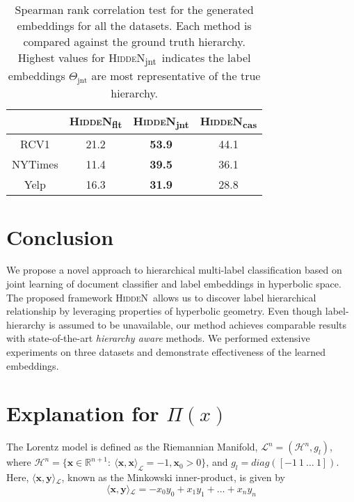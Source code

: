 \documentclass[11pt,a4paper]{article}
\newcommand{\model}{\mbox{\textsc{HiddeN}}}
\newcommand{\modeljnt}{\mbox{\textsc{HiddeN}\textsubscript{jnt}}}
\newcommand{\modelcas}{\mbox{\textsc{HiddeN}\textsubscript{cas}}}
\newcommand{\modelflt}{\mbox{\textsc{HiddeN}\textsubscript{flt}}}
\begin{document}
\begin{table}[!h]
\centering
\caption{Spearman rank correlation test for the generated embeddings for all the datasets. Each method is compared against the ground truth hierarchy. Highest values for \modeljnt\ indicates the label embeddings $\Theta_{\text{jnt}}$ are most representative of the true hierarchy.}
\label{tab:correlation}
\begin{adjustbox}{max width=0.48\textwidth}
\begin{tabular}{cccc} 
\toprule
& \modelflt & \modeljnt & \modelcas \\
\toprule
RCV1 & 21.2 & \textbf{53.9} & 44.1 \\
NYTimes & 11.4 & \textbf{39.5}   & 36.1 \\
Yelp & 16.3 & \textbf{31.9}   & 28.8 \\
\bottomrule
\end{tabular}
\end{adjustbox}
\end{table}

\section{Conclusion}
We propose a novel approach to hierarchical multi-label classification based on joint learning of document classifier and label embeddings in hyperbolic space. The proposed framework \model\ allows us to discover label hierarchical relationship by leveraging properties of hyperbolic geometry. Even though label-hierarchy is assumed to be unavailable, our method achieves comparable results with state-of-the-art \textit{hierarchy aware} methods. We performed extensive experiments on three datasets and demonstrate effectiveness of the learned embeddings.




\newpage
\appendix

\section{Explanation for $\Pi(x)$}
The Lorentz model is defined as the Riemannian Manifold, $\mathcal{L}^{n} = (\mathcal{H}^n, g_l)$, where $\mathcal{H}^n = \{ \mathbf{x} \in \mathbb{R}^{n+1} :\ \langle \mathbf{x},\mathbf{x}\rangle_\mathcal{L} = -1, \mathbf{x}_0 > 0\}$, and $g_l=diag([-1\ 1\ \ldots\ 1])$. Here, $\langle \mathbf{x},\mathbf{y}\rangle{_\mathcal{L}}$, known as the Minkowski inner-product, is given by 
$$\langle \mathbf{x},\mathbf{y}\rangle{_\mathcal{L}} = -x_0 y_0 + x_1 y_1 + \ldots + x_{n} y_{n}$$
\end{document}
